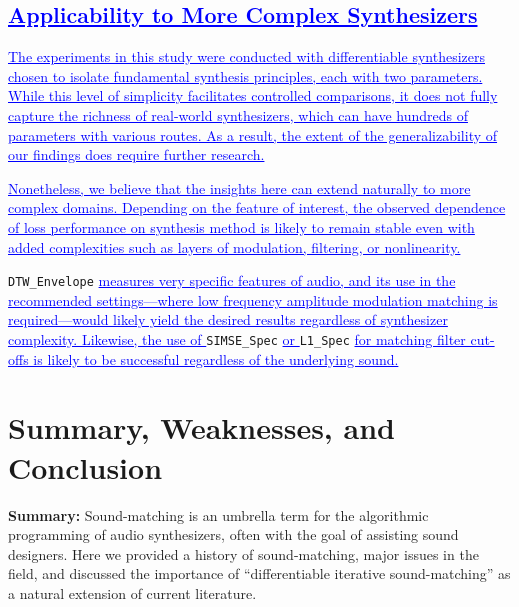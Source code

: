 \documentclass[lettersize,journal]{IEEEtran}
\renewcommand{\DIFadd}[1]{\textcolor{blue}{\uline{#1}}}
\newcommand{\SIMSESpec}{\texttt{SIMSE\_Spec}}
\newcommand{\LoneSpec}{\texttt{L1\_Spec}}
\newcommand{\DTWEnv}{\texttt{DTW\_Envelope}}
\providecommand{\DIFadd}[1]{{\protect\color{blue}\uwave{#1}}} %
\providecommand{\DIFaddend}{} %
\DeclareRobustCommand{\DIFaddend}{\DIFOaddend \let\includegraphics\DIFOincludegraphics} %
\begin{document}
\subsection{\DIFadd{Applicability to More Complex Synthesizers}}
\DIFadd{The experiments in this study were conducted with differentiable synthesizers chosen to isolate fundamental synthesis principles, each with two parameters. While this level of simplicity facilitates controlled comparisons, it does not fully capture the richness of real-world synthesizers, which can have hundreds of parameters with various routes. As a result, the extent of the generalizability of our findings does require further research. 
}

\DIFadd{Nonetheless, we believe that the insights here can extend naturally to more complex domains. Depending on the feature of interest, the observed dependence of loss performance on synthesis method is likely to remain stable even with added complexities such as layers of modulation, filtering, or nonlinearity. 
}

\DTWEnv{} \DIFadd{measures very specific features of audio, and its use in the recommended settings---where low frequency amplitude modulation matching is required---would likely yield the desired results regardless of synthesizer complexity. Likewise, the use of }\SIMSESpec{} \DIFadd{or }\LoneSpec{} \DIFadd{for matching filter cut-offs is likely to be successful regardless of the underlying sound. 
}





\DIFaddend \section{Summary, Weaknesses, and Conclusion}
\label{sec:summary_conclusion}
\textbf{Summary:} Sound-matching is an umbrella term for the algorithmic programming of audio synthesizers, often with the goal of assisting sound designers. Here we provided a history of sound-matching, major issues in the field, and discussed the importance of ``differentiable iterative sound-matching'' as a natural extension of current literature.
\end{document}
